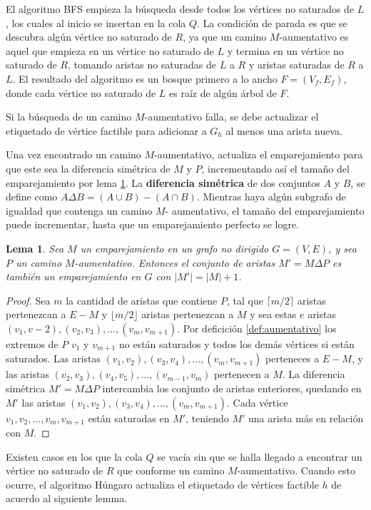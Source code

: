 \documentclass[10pt]{article} %
\newtheorem{lem}{Lema}
\begin{document}
El algoritmo BFS empieza la b\'usqueda desde todos los v\'ertices no saturados de $L$, los cuales al inicio se insertan en la cola $Q$. La condici\'on de parada es que se descubra alg\'un v\'ertice no saturado de $R$, ya que un camino $M$-aumentativo es aquel que empieza en un v\'ertice no saturado de $L$ y termina en un v\'ertice no saturado de $R$, tomando aristas no saturadas de $L$ a $R$ y aristas saturadas de $R$ a $L$. El resultado del algoritmo es un bosque primero a lo ancho $F = (V_f, E_f)$, donde cada v\'ertice no saturado de $L$ es ra\'iz de alg\'un \'arbol de $F$.

Si la b\'usqueda de un camino $M$-aumentativo falla, se debe actualizar el etiquetado de v\'ertice factible para adicionar a $G_h$ al menos una arista nueva.

Una vez encontrado un camino $M$-aumentativo, actualiza el emparejamiento para que este sea la diferencia sim\'etrica de $M$ y $P$, incrementando as\'i el tama\~no del emparejamiento por lema \ref{lm:ds}. La \textbf{diferencia sim\'etrica} de dos conjuntos $A$ y $B$, se define como $A \Delta B = (A \cup B) - (A \cap B)$. Mientras haya alg\'un subgrafo de igualdad que contenga un camino $M$- aumentativo, el tama\~no del emparejamiento puede incrementar, hasta que un emparejamiento perfecto se logre.

\begin{lem}\cite{introduction}
	\label{lm:ds}
	Sea $M$ un emparejamiento en un grafo no dirigido $G=(V,E)$, y sea $P$ un camino $M$-aumentativo. Entonces el conjunto de aristas $M' = M \Delta P$ es tambi\'en un emparejamiento en $G$ con $|M'| = |M| + 1$.
\end{lem}

\begin{proof}
	Sea $m$ la cantidad de aristas que contiene $P$, tal que $\lceil m/2 \rceil$ aristas pertenezcan a $E-M$ y $\lfloor m/2 \rfloor$ aristas pertenezcan a $M$ y sea estas $e$ aristas $(v_1,v-2),(v_2,v_3),...,(v_m,v_{m+1})$. Por deficici\'on \ref{def:aumentativo} los extremos de $P$ $v_1$ y $v_{m+1}$ no est\'an saturados y todos los dem\'as v\'ertices si est\'an saturados. Las aristas $(v_1,v_2),(v_3,v_4),...,(v_m,v_{m+1})$ perteneces a $E-M$, y las aristas $(v_2,v_3), (v_4,v_5),...,(v_{m-1},v_m)$ pertenecen a $M$. La diferencia sim\'etrica $M'=M \Delta P$ intercambia los conjunto de aristas enteriores, quedando en $M'$ las aristas $(v_1,v_2),(v_3,v_4),...,(v_m,v_{m+1})$. Cada v\'ertice $v_1,v_2,...,v_m,v_{m+1}$ est\'an saturadas en $M'$, teniendo $M'$ una arista m\'as en relaci\'on con $M$.
\end{proof}
Existen casos en los que la cola $Q$ se vac\'ia sin que se halla llegado a encontrar un v\'ertice no saturado de $R$ que conforme un camino $M$-aumentativo. Cuando esto ocurre, el algoritmo H\'ungaro actualiza el etiquetado de v\'ertices factible $h$ de acuerdo al siguiente lemma.
\end{document}
